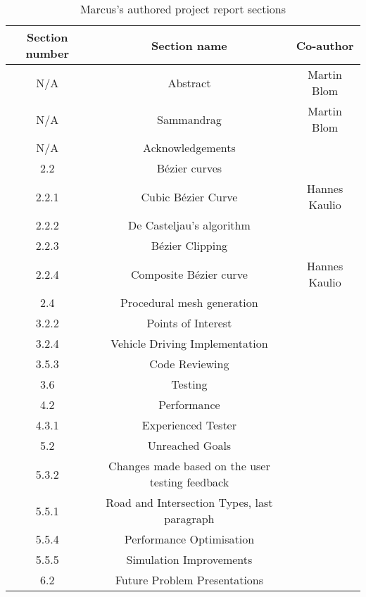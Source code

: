     \begin{table}[ht]
        \centering
            \begin{tabular}{|c|c|c|}
                \hline
                \textbf{Section number} & \textbf{Section name} & \textbf{Co-author}
                \\\hline
                N/A & Abstract & Martin Blom
                \\\hline
                N/A & Sammandrag & Martin Blom
                \\\hline
                N/A & Acknowledgements &
                \\\hline
                2.2 & Bézier curves &
                \\\hline
                2.2.1 & Cubic Bézier Curve & Hannes Kaulio
                \\\hline
                2.2.2 & De Casteljau's algorithm &
                \\\hline
                2.2.3 & Bézier Clipping &
                \\\hline
                2.2.4 & Composite Bézier curve & Hannes Kaulio
                \\\hline
                2.4 & Procedural mesh generation &
                \\\hline
                3.2.2 & Points of Interest &
                \\\hline
                3.2.4 & Vehicle Driving Implementation &
                \\\hline
                3.5.3 & Code Reviewing &
                \\\hline
                3.6 & Testing &
                \\\hline
                4.2 & Performance &
                \\\hline
                4.3.1 & Experienced Tester &
                \\\hline
                5.2 & Unreached Goals &
                \\\hline
                5.3.2 & Changes made based on the user testing feedback &
                \\\hline
                5.5.1 & Road and Intersection Types, last paragraph &
                \\\hline
                5.5.4 & Performance Optimisation &
                \\\hline
                5.5.5 & Simulation Improvements &
                \\\hline
                6.2 & Future Problem Presentations &
                
                \\\hline
            \end{tabular}
        \caption{Marcus's authored project report sections}
        \label{Tab:marcus-authored-sections}
    \end{table}